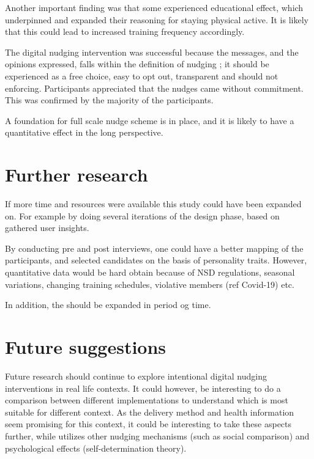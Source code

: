 Another important finding was that some experienced educational effect, which underpinned and expanded their reasoning for staying physical active. It is likely that this could lead to increased training frequency accordingly. 


The digital nudging intervention was successful because the messages, and the opinions expressed, falls within the definition of nudging ; it should be experienced as a free choice, easy to opt out, transparent and should not enforcing. Participants appreciated that the nudges came without commitment. This was confirmed by the majority of the participants. 

A foundation for full scale nudge scheme is in place, and it is likely to have a quantitative effect in the long perspective. 



\section{Further research}

If more time and resources were available this study could have been expanded on. For example by doing several iterations of the design phase, based on gathered user insights.  

By conducting pre and post interviews, one could have a better mapping of the participants, and selected candidates on the basis of personality traits. However, quantitative data would be hard obtain because of NSD regulations, seasonal variations, changing training schedules, violative members (ref Covid-19) etc.

In addition, the should be expanded in period og time. 

\section{Future suggestions}
Future research should continue to explore intentional digital nudging interventions in real life contexts. It could however, be interesting to do a comparison between different implementations to understand which is most suitable for different context. As the delivery method and health information seem promising for this context, it could be interesting to take these aspects further, while utilizes other nudging mechanisms (such as social comparison) and psychological effects (self-determination theory). 

